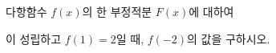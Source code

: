 다항함수 $f(x)$의 한 부정적분 $F(x)$에 대하여 \par\smallskip{}\par\smallskip\noindent 이 성립하고 $f(1)=2$일 때, $f(-2)$의 값을 구하시오.
